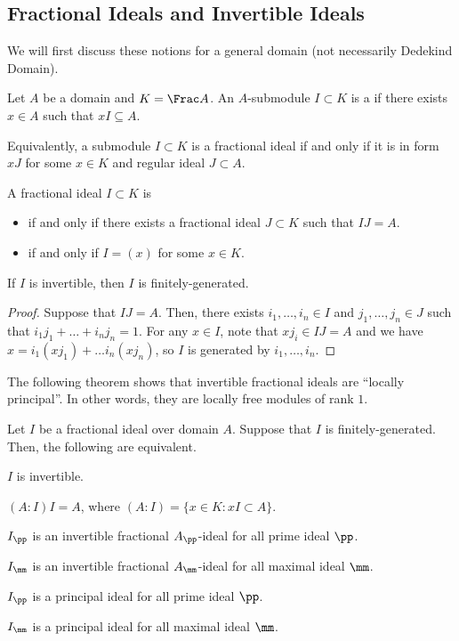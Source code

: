 \subsection{Fractional Ideals and Invertible Ideals}
We will first discuss these notions for a general domain
(not necessarily Dedekind Domain).
\begin{definition}
    Let $A$ be a domain and $K=\Frac A$.
    An $A$-submodule $I\subset K$ is a  if there exists $x\in A$ such that $xI\subseteq A$.

    Equivalently, a submodule $I\subset K$ is a fractional ideal
    if and only if it is in form $xJ$ for some $x\in K$
    and regular ideal $J\subset A$.
\end{definition}
\begin{definition}
    A fractional ideal $I\subset K$ is 
    \begin{itemize}
    \item {}
    if and only if there exists a fractional ideal
    $J\subset K$ such that $IJ=A$.
    \item {}
    if and only if $I=(x)$ for some $x\in K$.
    \end{itemize}
\end{definition}
\begin{proposition}
    If $I$ is invertible, then $I$ is finitely-generated.
\end{proposition}
\begin{proof}
    Suppose that $IJ=A$. Then, there exists
    $i_1,\dots,i_n\in I$ and $j_1,\dots,j_n\in J$
    such that $i_1j_1 + \dots + i_nj_n=1$.
    For any $x\in I$, note that $xj_i \in IJ = A$
    and we have $x = i_1(xj_1) + \dots i_n(xj_n)$,
    so $I$ is generated by $i_1,\dots,i_n$.
\end{proof}
The following theorem shows that invertible fractional
ideals are ``locally principal''.
In other words, they are locally free modules of rank $1$.
\begin{theorem}
    \label{thm:fractional_ideal}
    Let $I$ be a fractional ideal over domain $A$. 
    Suppose that $I$ is finitely-generated.
    Then, the following
    are equivalent.
    \begin{alphenum}
    \item $I$ is invertible.
    \item $(A:I)I = A$,
    where $(A:I) = \{x\in K : xI\subset A\}$.
    \item $I_\pp$ is an invertible fractional $A_\pp$-ideal 
    for all prime ideal $\pp$.
    \item $I_\mm$ is an invertible fractional $A_\mm$-ideal
    for all maximal ideal $\mm$.
    \item $I_\pp$ is a principal ideal for all prime ideal $\pp$.
    \item $I_\mm$ is a principal ideal for all maximal ideal $\mm$.
    \end{alphenum}
\end{theorem}
